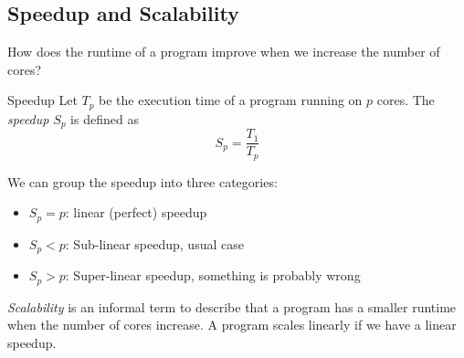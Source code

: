 \subsection{Speedup and Scalability}

How does the runtime of a program improve when we increase the number of cores?

\begin{definition}{Speedup}
    Let $T_p$ be the execution time of a program running on $p$ cores.
    The \emph{speedup} $S_p$ is defined as
    $$S_p = \frac{T_1}{T_p}$$
\end{definition}

We can group the speedup into three categories:
\begin{itemize}
    \item $S_p = p$: linear (perfect) speedup
    \item $S_p < p$: Sub-linear speedup, usual case
    \item $S_p > p$: Super-linear speedup, something is probably wrong
\end{itemize}

\emph{Scalability} is an informal term to describe that a program has a smaller runtime when the number of cores increase.
A program scales linearly if we have a linear speedup.
